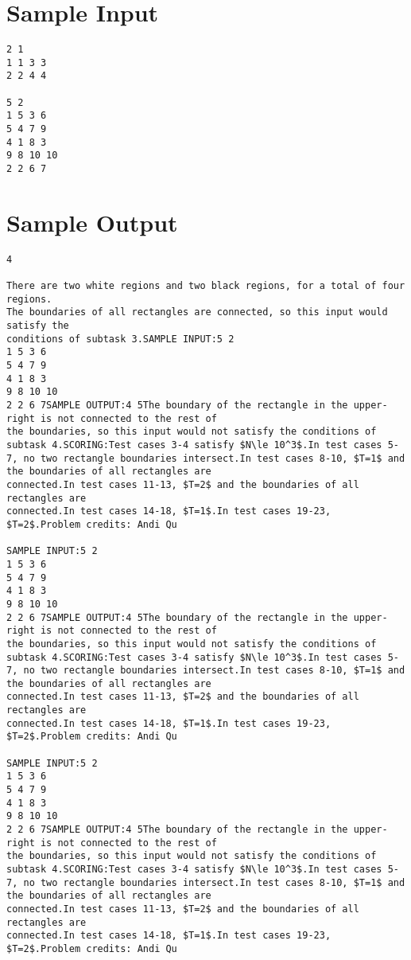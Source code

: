 \documentclass[12pt]{article}
\begin{document}
\section*{Sample Input}
\begin{verbatim}
2 1
1 1 3 3
2 2 4 4

5 2
1 5 3 6
5 4 7 9
4 1 8 3
9 8 10 10
2 2 6 7
\end{verbatim}

\section*{Sample Output}
\begin{verbatim}
4

There are two white regions and two black regions, for a total of four regions.
The boundaries of all rectangles are connected, so this input would satisfy the
conditions of subtask 3.SAMPLE INPUT:5 2
1 5 3 6
5 4 7 9
4 1 8 3
9 8 10 10
2 2 6 7SAMPLE OUTPUT:4 5The boundary of the rectangle in the upper-right is not connected to the rest of
the boundaries, so this input would not satisfy the conditions of subtask 4.SCORING:Test cases 3-4 satisfy $N\le 10^3$.In test cases 5-7, no two rectangle boundaries intersect.In test cases 8-10, $T=1$ and the boundaries of all rectangles are
connected.In test cases 11-13, $T=2$ and the boundaries of all rectangles are
connected.In test cases 14-18, $T=1$.In test cases 19-23, $T=2$.Problem credits: Andi Qu

SAMPLE INPUT:5 2
1 5 3 6
5 4 7 9
4 1 8 3
9 8 10 10
2 2 6 7SAMPLE OUTPUT:4 5The boundary of the rectangle in the upper-right is not connected to the rest of
the boundaries, so this input would not satisfy the conditions of subtask 4.SCORING:Test cases 3-4 satisfy $N\le 10^3$.In test cases 5-7, no two rectangle boundaries intersect.In test cases 8-10, $T=1$ and the boundaries of all rectangles are
connected.In test cases 11-13, $T=2$ and the boundaries of all rectangles are
connected.In test cases 14-18, $T=1$.In test cases 19-23, $T=2$.Problem credits: Andi Qu

SAMPLE INPUT:5 2
1 5 3 6
5 4 7 9
4 1 8 3
9 8 10 10
2 2 6 7SAMPLE OUTPUT:4 5The boundary of the rectangle in the upper-right is not connected to the rest of
the boundaries, so this input would not satisfy the conditions of subtask 4.SCORING:Test cases 3-4 satisfy $N\le 10^3$.In test cases 5-7, no two rectangle boundaries intersect.In test cases 8-10, $T=1$ and the boundaries of all rectangles are
connected.In test cases 11-13, $T=2$ and the boundaries of all rectangles are
connected.In test cases 14-18, $T=1$.In test cases 19-23, $T=2$.Problem credits: Andi Qu


\end{verbatim}
\end{document}
